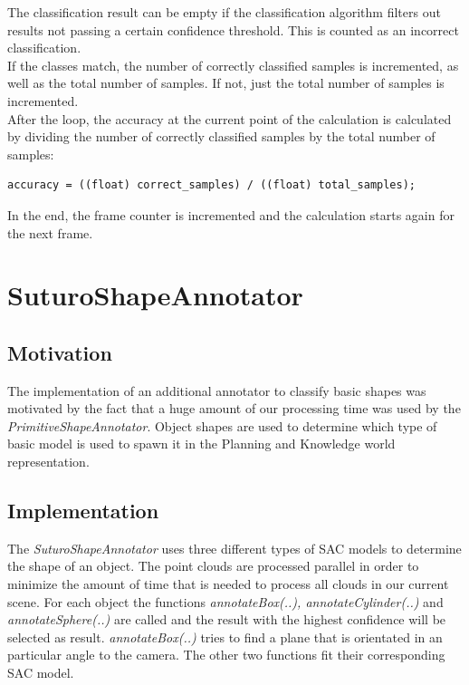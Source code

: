 \documentclass[main.tex]{subfiles}
\begin{document}
The classification result can be empty if the classification algorithm filters out results not passing a certain confidence threshold. This is counted as an incorrect classification.\\

If the classes match, the number of correctly classified samples is incremented, as well as the total number of samples. If not, just the total number of samples is incremented.\\

After the loop, the accuracy at the current point of the calculation is calculated by dividing the number of correctly classified samples by the total number of samples:

\begin{lstlisting}
accuracy = ((float) correct_samples) / ((float) total_samples);
\end{lstlisting}

In the end, the frame counter is incremented and the calculation starts again for the next frame.

\section{SuturoShapeAnnotator}

\subsection{Motivation}
The implementation of an additional annotator to classify basic shapes was motivated by the fact that a huge amount of our processing time
was used by the \textit{PrimitiveShapeAnnotator}. Object shapes are used to determine which type of basic model is used to spawn it in the Planning and Knowledge world representation.

\subsection{Implementation}
The \textit{SuturoShapeAnnotator} uses three different types of SAC models to determine the shape of an object.
The point clouds are processed parallel in order to minimize the amount of time that is needed to process all clouds in our current scene.
For each object the functions \textit{annotateBox(..), annotateCylinder(..)} and \textit{annotateSphere(..)} are called and the result with the highest confidence
will be selected as result. \textit{annotateBox(..)} tries to find a plane that is orientated in an particular angle to the camera. 
The other two functions fit their corresponding SAC model.
\end{document}
